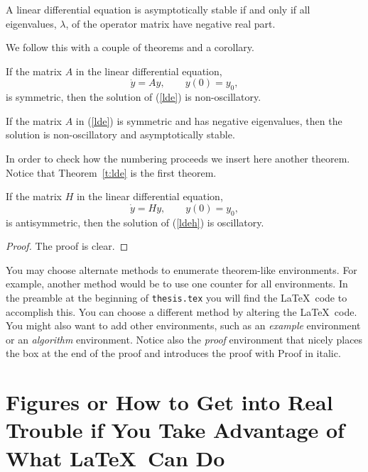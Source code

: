 \begin{definition}   
\label{d:stable}
A linear differential equation is asymptotically stable if and only if
all eigenvalues, $\lambda$, of the operator matrix have negative real
part.
\end{definition}
We follow this with a couple of theorems and a corollary.
\begin{theorem}
\label{t:lde}
If the matrix $A$ in the linear differential equation,
\begin{equation}
\dot{y} = Ay, \qquad y(0) = y_0, \label{lde}
\end{equation}
is symmetric, then the solution of {\rm (\ref{lde})} is non-oscillatory.
\end{theorem}
\begin{corollary}
\label{c:symmetric}
If the matrix $A$ in {\rm (\ref{lde})} is symmetric and has negative
eigenvalues, then the solution is non-oscillatory and asymptotically
stable.
\end{corollary}

In order to check how the numbering proceeds we insert here another
theorem.  Notice that Theorem~\ref{t:lde} is the first theorem.
\begin{theorem}
\label{t:antisymmetric}
If the matrix $H$ in the linear differential equation,
\begin{equation}
\dot{y} = Hy, \qquad y(0) = y_0, \label{ldeh}
\end{equation}
is antisymmetric, then the solution of {\rm (\ref{ldeh})} is oscillatory.
\end{theorem}

\begin{proof}
The proof is clear.
\end{proof}

You may choose alternate methods to enumerate theorem-like
environments.  For example, another method would be to use one counter
for all environments.  
In  the preamble at the  beginning of  {\tt thesis.tex} 
you will find the \LaTeX\ code to accomplish this.
You can choose a different method by altering the \LaTeX\ code.
You might also want to add other environments, such as an 
{\em example} environment or an {\em algorithm} environment.
Notice also the {\em proof} environment that nicely places the box at
the end of the proof and introduces the proof with Proof in italic.

\section{Figures or How to Get into Real Trouble if You Take Advantage
of What \LaTeX\ Can Do}
\label{s:figures}

